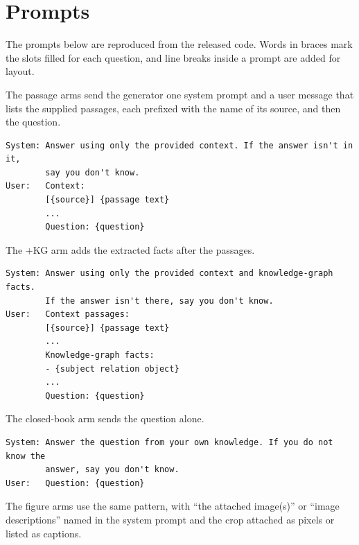 \documentclass[preprint,12pt]{elsarticle}
\begin{document}
\section{Prompts}
\label{app:prompts}
The prompts below are reproduced from the released code. Words in braces mark
the slots filled for each question, and line breaks inside a prompt are added
for layout.

The passage arms send the generator one system prompt and a user message that
lists the supplied passages, each prefixed with the name of its source, and
then the question.
{\scriptsize
\begin{verbatim}
System: Answer using only the provided context. If the answer isn't in it,
        say you don't know.
User:   Context:
        [{source}] {passage text}
        ...
        Question: {question}
\end{verbatim}}
\noindent The +KG arm adds the extracted facts after the passages.
{\scriptsize
\begin{verbatim}
System: Answer using only the provided context and knowledge-graph facts.
        If the answer isn't there, say you don't know.
User:   Context passages:
        [{source}] {passage text}
        ...
        Knowledge-graph facts:
        - {subject relation object}
        ...
        Question: {question}
\end{verbatim}}
\noindent The closed-book arm sends the question alone.
{\scriptsize
\begin{verbatim}
System: Answer the question from your own knowledge. If you do not know the
        answer, say you don't know.
User:   Question: {question}
\end{verbatim}}
\noindent The figure arms use the same pattern, with ``the attached image(s)''
or ``image descriptions'' named in the system prompt and the crop attached as
pixels or listed as captions.
\end{document}
